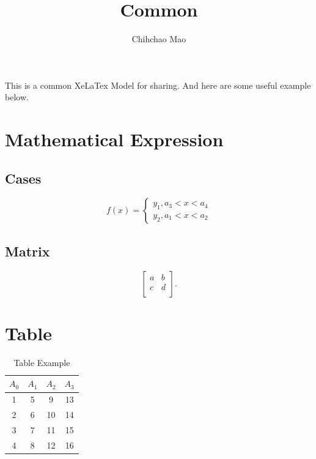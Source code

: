 \documentclass[a4paper 14pt]{article}
\title{Common}
\author{Chihchao Mao}
\date{}%
\newcommand{\xiaosihao}{\fontsize{12pt}{\baselineskip}\selectfont}  %
\numberwithin{figure}{section} %
\numberwithin{table}{section} %
\begin{document}
	\maketitle
	\xiaosihao

This is a common XeLaTex Model for sharing. And here are some useful example below.


\section{Mathematical Expression}
\subsection{Cases}
	\begin{equation}
		f(x)=
			\begin{cases}
				y_1,a_3<x<a_4\\
				y_2,a_1<x<a_2
			\end{cases}
	\end{equation}

\subsection{Matrix}
	\begin{equation}
		\left[              
		\begin{array}{cc}   
			a & b \\  
			c & d \\  
		\end{array}
		\right]. 	
	\end{equation} 

\section{Table}
	\begin{table}[htbp]
		\centering
			\begin{tabular}{c|c|c|c}
			\hline
			 $A_0$ & $A_1$ & $A_2$ & $A_3$\\
			\hline
			1 & 5 & 9 & 13 \\
			2 & 6 & 10 & 14 \\
			3 & 7 & 11 & 15 \\
			4 & 8 & 12 &  16 \\
			\hline
			\end{tabular}
		\caption{Table Example}
	\end{table}	
\end{document}
